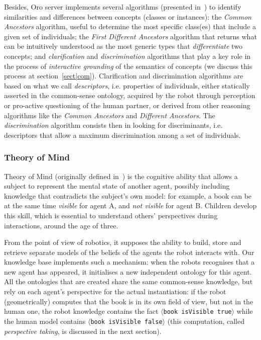 \documentclass[preprint,3p,times]{elsarticle}
\newcommand{\stmt}[1]{{\footnotesize\tt$\langle$#1\relax$\rangle$}}
\newcommand{\ie}{i.e.\xspace}
\begin{document}
Besides, {\sc Oro} server implements several algorithms (presented
in~\cite{Ros2010b}) to identify
similarities and differences between concepts (classes or
instances): the \emph{Common Ancestors} algorithm, useful to
determine the most specific class(es) that include a given set of individuals;
the \emph{First Different Ancestors} algorithm that returns what can be
intuitively understood as the most generic types that \emph{differentiate} two
concepts; and \emph{clarification} and \emph{discrimination} algorithms that
play a key role in the process of \emph{interactive grounding} of the semantics
of concepts (we discuss this process at section~\ref{sect|com}). Clarification
and discrimination algorithms are based on what we call \emph{descriptors}, \ie
properties of individuals, either statically asserted in the common-sense
ontology, acquired by the robot through perception or pro-active questioning of
the human partner, or derived from other reasoning algorithms like the
\emph{Common Ancestors} and \emph{Different Ancestors}. The
\emph{discrimination} algorithm consists then in looking for discriminants, \ie
descriptors that allow a maximum discrimination among a set of individuals.

\subsubsection{Theory of Mind}
\label{sect|tom}

Theory of Mind (originally defined in~\cite{Premack1978}) is the cognitive
ability that allows a subject to represent the mental state of another
agent, possibly including knowledge that contradicts the subject's own model: for
example, a book can be at the same time \emph{visible} for agent A, and \emph{not
visible} for agent B. Children develop this skill, which is essential to understand others' perspectives during
interactions, around the age of three. 

From the point of view of robotics, it supposes the ability to build, store and
retrieve separate models of the beliefs of the agents the robot interacts with.
Our knowledge base implements such a mechanism: when the robots recognises that
a new agent has appeared, it initialises a new
independent ontology for this agent. All the ontologies that are created share
the same common-sense knowledge, but rely on each agent's perspective for the
actual instantiation: if the robot (geometrically) computes that the book is in its
own field of view, but not in the human one, the robot knowledge contains the
fact \stmt{book isVisible true} while the human model contains \stmt{book
isVisible false} (this computation, called \emph{perspective taking}, is
discussed in the next section).
\end{document}
